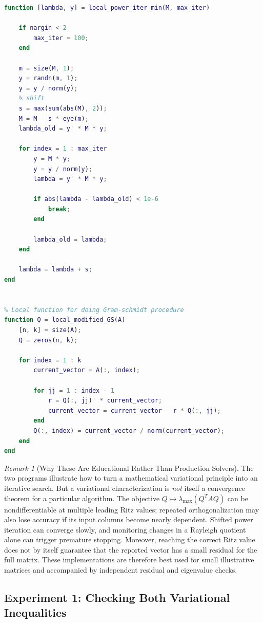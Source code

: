 \documentclass[14pt,letterpaper]{article}
\theoremstyle{plain}
\theoremstyle{definition}
\theoremstyle{remark}
\newtheorem{remark}[theorem]{Remark}
\begin{document}
\begin{lstlisting}[language=Matlab,caption={Original educational Courant--Fischer maximin implementation.},label={lst:cf_maxmin}]
function [lambda, y] = local_power_iter_min(M, max_iter)

	if nargin < 2
		max_iter = 100;
	end

	m = size(M, 1);
	y = randn(m, 1);
	y = y / norm(y);
	% shift
	s = max(sum(abs(M), 2));
	M = M - s * eye(m);
	lambda_old = y' * M * y;

	for index = 1 : max_iter
		y = M * y;
		y = y / norm(y);
		lambda = y' * M * y;

		if abs(lambda - lambda_old) < 1e-6
			break;
		end

		lambda_old = lambda;
	end

	lambda = lambda + s;
end


% Local function for doing Gram-schmidt procedure
function Q = local_modified_GS(A)
	[n, k] = size(A);
	Q = zeros(n, k);

	for index = 1 : k 
		current_vector = A(:, index);

		for jj = 1 : index - 1 
			r = Q(:, jj)' * current_vector;
			current_vector = current_vector - r * Q(:, jj);
		end
		Q(:, index) = current_vector / norm(current_vector);
	end
end
\end{lstlisting}

\begin{remark}[Why These Are Educational Rather Than Production Solvers]
The two programs illustrate how to turn a mathematical
variational principle into an iterative search. But a
variational characterization is \emph{not} itself a
convergence theorem for a particular algorithm.
The objective $Q\mapsto\lambda_{\max}(Q^TAQ)$ can be
nondifferentiable at multiple leading Ritz values;
repeated orthogonalization may also lose accuracy if
its input columns become nearly dependent. Shifted
power iteration can converge slowly, and monitoring
changes in a Rayleigh quotient alone can trigger
premature stopping. Moreover, reaching the correct
Ritz value does not by itself guarantee that the
reported vector has a small residual for the full
matrix. These implementations are therefore best
used for small illustrative matrices and accompanied
by independent residual and eigenvalue checks.
\end{remark}

\subsection{Experiment 1: Checking Both Variational Inequalities}
\label{subsec:matlab_cf_experiment}
\end{document}
